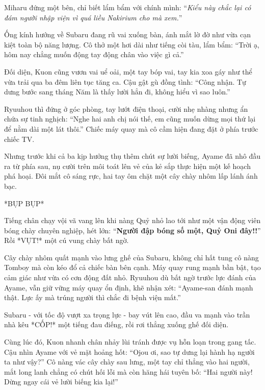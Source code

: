 \documentclass[../main.tex]{subfiles}
\begin{document}
Miharu đứng một bên, chỉ biết lẩm bẩm với chính mình: ``\textit{Kiểu này chắc lại có đám người nhập viện vì quá liều Nakirium cho mà xem.}''

\ct

Ống kính hướng về Subaru đang rũ vai xuống bàn, ánh mắt lờ đờ như vừa cạn kiệt toàn bộ năng lượng. Cô thở một hơi dài như tiếng còi tàu, lẩm bẩm: ``Trời ạ, hôm nay chẳng muốn động tay động chân vào việc gì cả.''

Đối diện, Kuon cũng vươn vai uể oải, một tay bóp vai, tay kia xoa gáy như thể vừa trải qua ba đêm liên tục tăng ca. Cậu gật gù đồng tình: ``Công nhận. Tự dưng bước sang tháng Năm là thấy lười hẳn đi, không hiểu vì sao luôn.''

Ryuuhou thì đứng ở góc phòng, tay lướt điện thoại, cười nhẹ nhàng nhưng ẩn chứa sự tinh nghịch: ``Nghe hai anh chị nói thế, em cũng muốn dừng mọi thứ lại để nằm dài một lát thôi.'' Chiếc máy quay mà cô cầm hiện đang đặt ở phía trước chiếc TV.

Nhưng trước khi cả ba kịp hưởng thụ thêm chút sự lười biếng, Ayame đã nhô đầu ra từ phía sau, nụ cười trên môi toát lên vẻ của kẻ sắp thực hiện một kế hoạch phá hoại. Đôi mắt cô sáng rực, hai tay ôm chặt một cây chày nhôm lấp lánh ánh bạc.


*BỤP BỤP*

Tiếng chân chạy vội vã vang lên khi nàng Quỷ nhỏ lao tới như một vận động viên bóng chày chuyên nghiệp, hét lớn: ``\textbf{Người đập bóng số một, Quỷ Oni đây!!}'' Rồi *VỤT!* một cú vung chày bất ngờ.

Cây chày nhôm quất mạnh vào lưng ghế của Subaru, không chỉ hất tung cô nàng Tomboy mà còn kéo đổ cả chiếc bàn bên cạnh. Máy quay rung mạnh bần bật, tạo cảm giác như vừa có cơn động đất nhỏ. Ryuuhou dù bất ngờ trước lực đánh của Ayame, vẫn giữ vững máy quay ổn định, khẽ nhận xét: ``Ayame-san đánh mạnh thật. Lực ấy mà trúng người thì chắc đi bệnh viện mất.''

Subaru - với tốc độ vượt xa trọng lực - bay vút lên cao, đầu va mạnh vào trần nhà kêu *CỐP!* một tiếng đau điếng, rồi rơi thẳng xuống ghế đối diện.


Cùng lúc đó, Kuon nhanh chân nhảy lùi tránh được vụ hỗn loạn trong gang tấc. Cậu nhìn Ayame với vẻ mặt hoảng hốt: ``Ojou ơi, sao tự dưng lại hành hạ người ta như vậy?'' Cô nàng vác cây chày sau lưng, một tay chỉ thẳng vào hai người, mắt long lanh chẳng có chút hối lỗi mà còn hăng hái tuyên bố: ``Hai người này! Dừng ngay cái vẻ lười biếng kia lại!''
\end{document}
